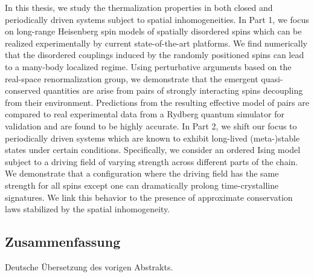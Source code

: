 In this thesis, we study the thermalization properties in both closed and periodically driven systems subject to spatial inhomogeneities. 
In Part 1, we focus on long-range Heisenberg spin models of spatially disordered spins which can be realized experimentally by current state-of-the-art platforms.
We find numerically that the disordered couplings induced by the randomly positioned spins can lead to a many-body localized regime. Using perturbative arguments based on the real-space renormalization group, we demonstrate that the emergent quasi-conserved quantities are arise from pairs of strongly interacting spins decoupling from their environment. Predictions from the resulting effective model of pairs are compared to real experimental data from a Rydberg quantum simulator for validation and are found to be highly accurate.
In Part 2, we shift our focus to periodically driven systems which are known to exhibit long-lived (meta-)stable states under certain conditions. Specifically, we consider an ordered Ising model subject to a driving field of varying strength across different parts of the chain. We demonstrate that a configuration where the driving field has the same strength for all spins except one can dramatically prolong time-crystalline signatures. We link this behavior to the presence of approximate conservation laws stabilized by the spatial inhomogeneity.


\newpage
\begin{otherlanguage}{ngerman}
\chapter*{Zusammenfassung}
Deutsche Übersetzung des vorigen Abstrakts.

\end{otherlanguage}

\endgroup

\vfill

\color{black}